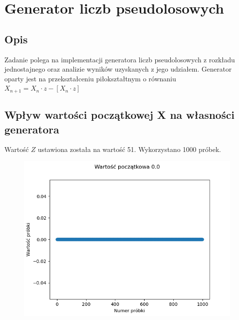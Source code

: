 \documentclass[12pt,a4paper]{article}
\begin{document}
\pdfpageheight   297mm
\pdfpagewidth    210mm

\StronaTytulowa
\SpisTresci

\pagebreak


\section{Generator liczb pseudolosowych}
  \subsection{Opis}
  Zadanie polega na implementacji generatora liczb pseudolosowych z rozkładu jednostajnego oraz analizie wyników uzyskanych z jego udziałem. Generator oparty jest na przekształceniu piłokształtnym o równaniu $X_{n+1} = X_n \cdot z - [X_n \cdot z]$ 

  \subsection{Wpływ wartości początkowej X na własności generatora}

  Wartość $Z$ ustawiona została na wartość 51. Wykorzystano 1000 próbek.

  \begin{figure}[H]
    \centering
    \includegraphics[height=0.3\textheight]{figures/Figure_1.png}
    \label{fig:1}
  \end{figure}
\end{document}
